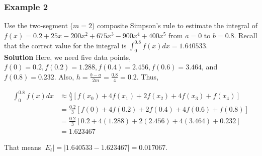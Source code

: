 \documentclass [titlepage,12pt,letter] {article}
\begin{document}
\subsubsection{Example 2} Use the two-segment ($m=2$) composite Simpson's rule to estimate the integral of $f(x)=0.2+25x-200x^2+675x^3-900x^4+400x^5$ from $a=0$ to $b=0.8$. Recall that the correct value for the integral is $\int_0^{0.8} f(x)dx=1.640533$. \\

\noindent
{\bf Solution} Here, we need  five data points, $f(0)=0.2, f(0.2)=1.288,f(0.4)=2.456,f(0.6)=3.464$, and $f(0.8)=0.232$. Also, $h=\frac{b-a}{2m}=\frac{0.8}{4}=0.2$. Thus,

\begin{align*}
\int_0^{0.8} f(x)dx &\approx \frac{h}{3} \left[f(x_0)+4f(x_1)+2f(x_2)+4f(x_3)+f(x_4) \right] \\
&= \frac{0.2}{3}\left[f(0)+4f(0.2)+2f(0.4)+4f(0.6)+f(0.8) \right] \\
&= \frac{0.2}{3}\left[0.2+4(1.288)+2(2.456)+4(3.464)+0.232 \right] \\
&=1.623467
\end{align*}

\noindent
That means $|E_t| = |1.640533 - 1.623467| = 0.017067$.
\end{document}
